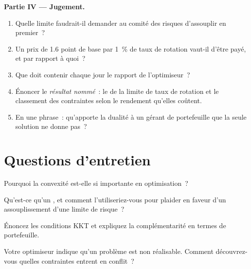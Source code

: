 \begin{problem}
\medskip\noindent\textbf{Partie IV --- Jugement.}
\begin{enumerate}[resume]
\item Quelle limite faudrait-il demander au comité des risques d'assouplir en premier~?
\item Un prix de 1.6 point de base par 1~\% de taux de rotation vaut-il d'être payé, et par rapport à quoi~?
\item Que doit contenir chaque jour le rapport de l'optimiseur~?
\item Énoncer le \emph{résultat nommé}~: le  de la limite de taux de rotation et le classement des contraintes selon le rendement qu'elles coûtent.
\item En une phrase~: qu'apporte la dualité à un gérant de portefeuille que la seule solution ne donne pas~?
\end{enumerate}
\end{problem}

\section{Questions d'entretien}

\begin{interviewq}\label{iq:qm:convex-optimisation:1}
Pourquoi la convexité est-elle si importante en optimisation~?
\end{interviewq}

\begin{interviewq}\label{iq:qm:convex-optimisation:2}
Qu'est-ce qu'un , et comment l'utiliseriez-vous pour plaider en faveur d'un assouplissement d'une limite de risque~?
\end{interviewq}

\begin{interviewq}\label{iq:qm:convex-optimisation:3}
Énoncez les conditions KKT et expliquez la complémentarité en termes de portefeuille.
\end{interviewq}

\begin{interviewq}\label{iq:qm:convex-optimisation:4}
Votre optimiseur indique qu'un problème est non réalisable. Comment découvrez-vous quelles contraintes entrent en conflit~?
\end{interviewq}

